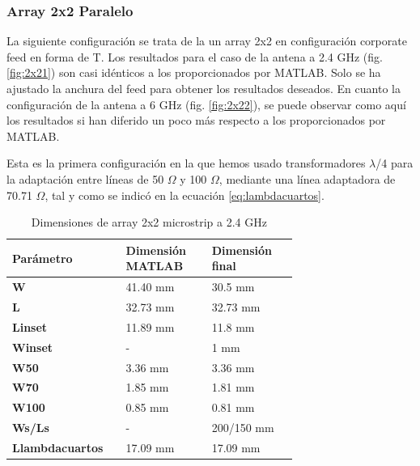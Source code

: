 \subsubsection{Array 2x2 Paralelo} 
\par La siguiente configuración se trata de la un array 2x2 en configuración corporate feed en forma de T. Los resultados para el caso de la antena a 2.4 GHz (fig. \ref{fig:2x21}) son casi idénticos a los proporcionados por MATLAB. Solo se ha ajustado la anchura del feed para obtener los resultados deseados. En cuanto la configuración de la antena a 6 GHz (fig. \ref{fig:2x22}), se puede observar como aquí los resultados si han diferido un poco más respecto a los proporcionados por MATLAB.
\\
\par Esta es la primera configuración en la que hemos usado transformadores  $\lambda$/4 para la adaptación entre líneas de 50 $\Omega$ y 100 $\Omega$, mediante una línea adaptadora de 70.71 $\Omega$, tal y como se indicó en la ecuación \ref{eq:lambdacuartos}.
\\
\begin{table}[H]
  
   \label{tab:array2x21}
   \small %
   \centering %
   \begin{tabular}{m{0.2\linewidth}m{0.25\linewidth}m{0.25\linewidth}} %
   \toprule[\heavyrulewidth]\toprule[\heavyrulewidth]
   \textbf{Parámetro} & \textbf{Dimensión MATLAB} & \textbf{Dimensión final} \\ 
   \midrule
   \textbf{W} & 41.40 mm & 30.5 mm \\
   \textbf{L} & 32.73 mm & 32.73 mm\\
   \textbf{Linset} & 11.89 mm & 11.8 mm\\
   \textbf{Winset} & - & 1 mm\\
   \textbf{W50} & 3.36 mm & 3.36 mm\\
   \textbf{W70} & 1.85 mm & 1.81 mm\\
   \textbf{W100} & 0.85 mm & 0.81 mm\\
   \textbf{Ws/Ls} & - & 200/150 mm\\
   \textbf{Llambdacuartos} & 17.09 mm & 17.09 mm\\
   \bottomrule[\heavyrulewidth] 
   \end{tabular}
   \caption{Dimensiones de array 2x2 microstrip a 2.4 GHz} 
\end{table}


